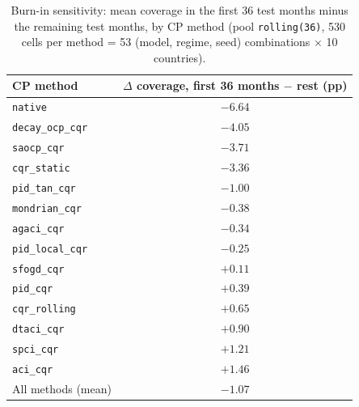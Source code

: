 \begin{table}[t]
\centering
\caption{Burn-in sensitivity: mean coverage in the first 36 test months minus the remaining test months, by CP method (pool \texttt{rolling(36)}, 530 cells per method = 53 (model, regime, seed) combinations $\times$ 10 countries).}
\label{tab:res_robustness_burnin}
\begin{tabular}{lc}
\toprule
CP method & $\Delta$ coverage, first 36 months $-$ rest (pp) \\
\midrule
\texttt{native}          & $-6.64$ \\
\texttt{decay\_ocp\_cqr} & $-4.05$ \\
\texttt{saocp\_cqr}      & $-3.71$ \\
\texttt{cqr\_static}     & $-3.36$ \\
\texttt{pid\_tan\_cqr}   & $-1.00$ \\
\texttt{mondrian\_cqr}   & $-0.38$ \\
\texttt{agaci\_cqr}      & $-0.34$ \\
\texttt{pid\_local\_cqr} & $-0.25$ \\
\texttt{sfogd\_cqr}      & $+0.11$ \\
\texttt{pid\_cqr}        & $+0.39$ \\
\texttt{cqr\_rolling}    & $+0.65$ \\
\texttt{dtaci\_cqr}      & $+0.90$ \\
\texttt{spci\_cqr}       & $+1.21$ \\
\texttt{aci\_cqr}        & $+1.46$ \\
\midrule
All methods (mean)       & $-1.07$ \\
\bottomrule
\end{tabular}
\end{table}

